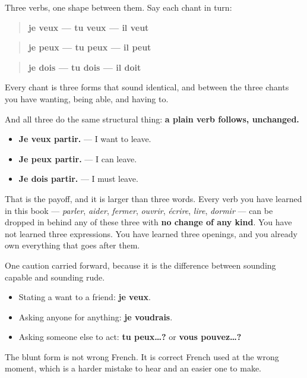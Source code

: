 \begin{grammarlens}[title={What you've built}]
Three verbs, one shape between them. Say each chant in turn:

\begin{quote}
\textbf{je veux — tu veux — il veut}
\end{quote}

\begin{quote}
\textbf{je peux — tu peux — il peut}
\end{quote}

\begin{quote}
\textbf{je dois — tu dois — il doit}
\end{quote}

Every chant is three forms that sound identical, and between the three chants you have wanting, being able, and having to.

And all three do the same structural thing: \textbf{a plain verb follows, unchanged.}

\begin{itemize}
\raggedright
  \item \textbf{Je veux partir.} — I want to leave.
  \item \textbf{Je peux partir.} — I can leave.
  \item \textbf{Je dois partir.} — I must leave.
\end{itemize}

That is the payoff, and it is larger than three words. Every verb you have learned in this book — \emph{parler}, \emph{aider}, \emph{fermer}, \emph{ouvrir}, \emph{écrire}, \emph{lire}, \emph{dormir} — can be dropped in behind any of these three with \textbf{no change of any kind}. You have not learned three expressions. You have learned three openings, and you already own everything that goes after them.
\end{grammarlens}

\begin{culture}
One caution carried forward, because it is the difference between sounding capable and sounding rude.

\begin{itemize}
\raggedright
  \item Stating a want to a friend: \textbf{je veux}.
  \item Asking anyone for anything: \textbf{je voudrais}.
  \item Asking someone else to act: \textbf{tu peux…?} or \textbf{vous pouvez…?}
\end{itemize}

The blunt form is not wrong French. It is correct French used at the wrong moment, which is a harder mistake to hear and an easier one to make.
\end{culture}

